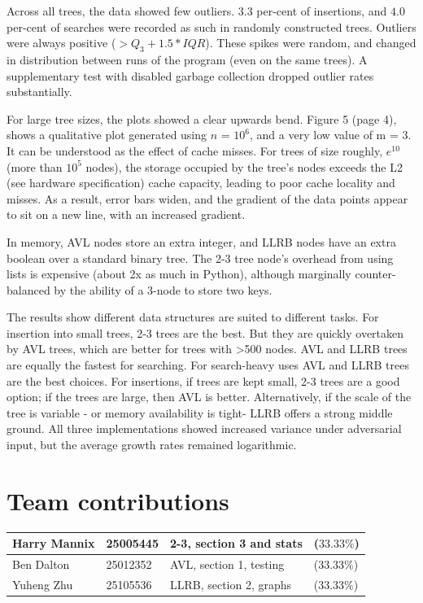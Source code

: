 \documentclass[12pt]{article}
\begin{document}
Across all trees, the data showed few outliers. $3.3$ per-cent of  insertions, and $4.0$ per-cent of searches were recorded as such in randomly constructed trees. Outliers were always positive ($> Q_3 + 1.5*IQR$). These spikes were random, and changed in distribution between runs of the program (even on the same trees). A supplementary test with disabled garbage collection dropped outlier rates substantially.

For large tree sizes, the plots showed a clear upwards bend. Figure 5 (page 4), shows a qualitative plot generated using $n$ = $10^6$, and a very low value of m = 3. It can be understood as the effect of cache misses. For trees of size roughly, $e^{10}$ (more than $10^5$ nodes), the storage occupied by the tree's nodes exceeds the L2 (see hardware specification) cache capacity, leading to poor cache locality and misses. As a result, error bars widen, and the gradient of the data points appear to sit on a new line, with an increased gradient. 

In memory, AVL nodes store an extra integer, and LLRB nodes have an extra boolean over a standard binary tree. The 2-3 tree node's overhead from using lists is expensive (about 2x as much in Python), although marginally counter-balanced by the ability of a 3-node to store two keys.

The results show different data structures are suited to different tasks. For insertion into small trees, 2-3 trees are the best. But they are quickly overtaken by AVL trees, which are better for trees with >500 nodes. AVL and LLRB trees are equally the fastest for searching. For search-heavy uses AVL and LLRB trees are the best choices. For insertions, if trees are kept small, 2-3 trees are a good option; if the trees are large, then AVL is better. Alternatively, if the scale of the tree is variable - or memory availability is tight-  LLRB offers a strong middle ground. All three implementations showed increased variance under adversarial input, but the average growth rates remained logarithmic.
\vspace{-2em}
\section{Team contributions}
\begin{tabular}{|l|l|l|l|}
\hline
Harry Mannix&  25005445&  2-3, section 3 and stats& ($33.33\%$)\\\hline
          Ben Dalton&            25012352&         AVL, section 1, testing&          ($33.33\%$)\\
\hline
 Yuheng Zhu& 25105536& LLRB, section 2, graphs&($33.33\%$)\\\hline
\end{tabular}
\vspace{-1em}
\printbibliography
\end{document}
